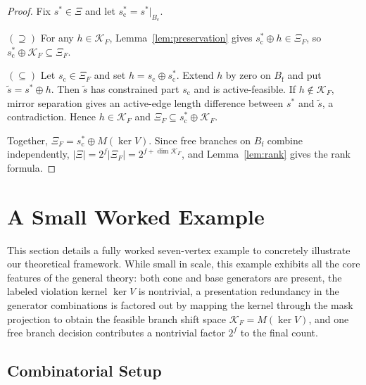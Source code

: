 \documentclass[11pt]{article}
\theoremstyle{plain}
\theoremstyle{definition}
\begin{document}
\begin{proof}
Fix $s^\ast \in \Xi$ and let $s^\ast_{\mathrm{c}} = s^\ast|_{B_{\mathrm{c}}}$.

$(\supseteq)$ For any $h \in \mathcal{K}_F$, Lemma~\ref{lem:preservation} gives
$s^\ast_{\mathrm{c}} \oplus h \in \Xi_F$, so $s^\ast_{\mathrm{c}} \oplus \mathcal{K}_F \subseteq \Xi_F$.

$(\subseteq)$ Let $s_{\mathrm{c}} \in \Xi_F$ and set $h = s_{\mathrm{c}} \oplus s^\ast_{\mathrm{c}}$.
Extend $h$ by zero on $B_{\mathrm{f}}$ and put $\widetilde{s}=s^\ast\oplus h$. Then $\widetilde{s}$ has constrained part $s_{\mathrm{c}}$ and is active-feasible. If $h \notin \mathcal{K}_F$, mirror separation gives an active-edge length difference between $s^\ast$ and $\widetilde{s}$, a contradiction. Hence $h \in \mathcal{K}_F$ and
$\Xi_F \subseteq s^\ast_{\mathrm{c}} \oplus \mathcal{K}_F$.

Together, $\Xi_F = s^\ast_{\mathrm{c}} \oplus M(\ker V)$. Since free branches on
$B_{\mathrm{f}}$ combine independently, $\lvert\Xi\rvert = 2^f \lvert\Xi_F\rvert
= 2^{f + \dim\mathcal{K}_F}$, and Lemma~\ref{lem:rank} gives the rank formula.
\end{proof}

\section{A Small Worked Example}
\label{sec:example}

This section details a fully worked seven-vertex example to concretely illustrate our theoretical framework. While small in scale, this example exhibits all the core features of the general theory: both cone and base generators are present, the labeled violation kernel $\ker V$ is nontrivial, a presentation redundancy in the generator combinations is factored out by mapping the kernel through the mask projection to obtain the feasible branch shift space $\mathcal{K}_F = M(\ker V)$, and one free branch decision contributes a nontrivial factor $2^f$ to the final count.

\subsection{Combinatorial Setup}
\label{sec:example-combo}
\end{document}
